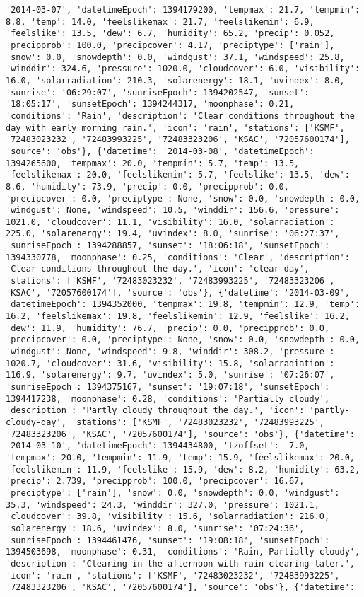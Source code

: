\documentclass[
  letterpaper,
  DIV=11,
  numbers=noendperiod]{scrartcl}
\begin{document}
\begin{verbatim}
'2014-03-07', 'datetimeEpoch': 1394179200, 'tempmax': 21.7, 'tempmin': 8.8, 'temp': 14.0, 'feelslikemax': 21.7, 'feelslikemin': 6.9, 'feelslike': 13.5, 'dew': 6.7, 'humidity': 65.2, 'precip': 0.052, 'precipprob': 100.0, 'precipcover': 4.17, 'preciptype': ['rain'], 'snow': 0.0, 'snowdepth': 0.0, 'windgust': 37.1, 'windspeed': 25.8, 'winddir': 324.6, 'pressure': 1020.0, 'cloudcover': 6.0, 'visibility': 16.0, 'solarradiation': 210.3, 'solarenergy': 18.1, 'uvindex': 8.0, 'sunrise': '06:29:07', 'sunriseEpoch': 1394202547, 'sunset': '18:05:17', 'sunsetEpoch': 1394244317, 'moonphase': 0.21, 'conditions': 'Rain', 'description': 'Clear conditions throughout the day with early morning rain.', 'icon': 'rain', 'stations': ['KSMF', '72483023232', '72483993225', '72483323206', 'KSAC', '72057600174'], 'source': 'obs'}, {'datetime': '2014-03-08', 'datetimeEpoch': 1394265600, 'tempmax': 20.0, 'tempmin': 5.7, 'temp': 13.5, 'feelslikemax': 20.0, 'feelslikemin': 5.7, 'feelslike': 13.5, 'dew': 8.6, 'humidity': 73.9, 'precip': 0.0, 'precipprob': 0.0, 'precipcover': 0.0, 'preciptype': None, 'snow': 0.0, 'snowdepth': 0.0, 'windgust': None, 'windspeed': 10.5, 'winddir': 156.6, 'pressure': 1021.0, 'cloudcover': 11.1, 'visibility': 16.0, 'solarradiation': 225.0, 'solarenergy': 19.4, 'uvindex': 8.0, 'sunrise': '06:27:37', 'sunriseEpoch': 1394288857, 'sunset': '18:06:18', 'sunsetEpoch': 1394330778, 'moonphase': 0.25, 'conditions': 'Clear', 'description': 'Clear conditions throughout the day.', 'icon': 'clear-day', 'stations': ['KSMF', '72483023232', '72483993225', '72483323206', 'KSAC', '72057600174'], 'source': 'obs'}, {'datetime': '2014-03-09', 'datetimeEpoch': 1394352000, 'tempmax': 19.8, 'tempmin': 12.9, 'temp': 16.2, 'feelslikemax': 19.8, 'feelslikemin': 12.9, 'feelslike': 16.2, 'dew': 11.9, 'humidity': 76.7, 'precip': 0.0, 'precipprob': 0.0, 'precipcover': 0.0, 'preciptype': None, 'snow': 0.0, 'snowdepth': 0.0, 'windgust': None, 'windspeed': 9.8, 'winddir': 308.2, 'pressure': 1020.7, 'cloudcover': 31.6, 'visibility': 15.8, 'solarradiation': 116.9, 'solarenergy': 9.7, 'uvindex': 5.0, 'sunrise': '07:26:07', 'sunriseEpoch': 1394375167, 'sunset': '19:07:18', 'sunsetEpoch': 1394417238, 'moonphase': 0.28, 'conditions': 'Partially cloudy', 'description': 'Partly cloudy throughout the day.', 'icon': 'partly-cloudy-day', 'stations': ['KSMF', '72483023232', '72483993225', '72483323206', 'KSAC', '72057600174'], 'source': 'obs'}, {'datetime': '2014-03-10', 'datetimeEpoch': 1394434800, 'tzoffset': -7.0, 'tempmax': 20.0, 'tempmin': 11.9, 'temp': 15.9, 'feelslikemax': 20.0, 'feelslikemin': 11.9, 'feelslike': 15.9, 'dew': 8.2, 'humidity': 63.2, 'precip': 2.739, 'precipprob': 100.0, 'precipcover': 16.67, 'preciptype': ['rain'], 'snow': 0.0, 'snowdepth': 0.0, 'windgust': 35.3, 'windspeed': 24.3, 'winddir': 327.0, 'pressure': 1021.1, 'cloudcover': 39.8, 'visibility': 15.6, 'solarradiation': 216.0, 'solarenergy': 18.6, 'uvindex': 8.0, 'sunrise': '07:24:36', 'sunriseEpoch': 1394461476, 'sunset': '19:08:18', 'sunsetEpoch': 1394503698, 'moonphase': 0.31, 'conditions': 'Rain, Partially cloudy', 'description': 'Clearing in the afternoon with rain clearing later.', 'icon': 'rain', 'stations': ['KSMF', '72483023232', '72483993225', '72483323206', 'KSAC', '72057600174'], 'source': 'obs'}, {'datetime': 
\end{verbatim}
\end{document}
